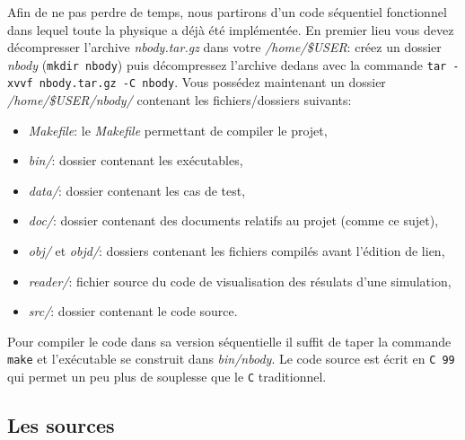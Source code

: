 Afin de ne pas perdre de temps, nous partirons d'un code séquentiel fonctionnel dans lequel toute la physique a déjà été implémentée.
En premier lieu vous devez décompresser l'archive \textit{nbody.tar.gz} dans votre \textit{/home/\$USER}:
créez un dossier \textit{nbody} (\texttt{mkdir nbody}) puis décompressez l'archive dedans avec la commande \texttt{tar -xvvf nbody.tar.gz -C nbody}.
Vous possédez maintenant un dossier \textit{/home/\$USER/nbody/} contenant les fichiers/dossiers suivants:
\begin{itemize}
	\item \textit{Makefile}: le \textit{Makefile} permettant de compiler le projet,
	\item \textit{bin/}: dossier contenant les exécutables,
	\item \textit{data/}: dossier contenant les cas de test,
	\item \textit{doc/}: dossier contenant des documents relatifs au projet (comme ce sujet),
	\item \textit{obj/} et \textit{objd/}: dossiers contenant les fichiers compilés avant l'édition de lien,
	\item \textit{reader/}: fichier source du code de visualisation des résulats d'une simulation,
	\item \textit{src/}: dossier contenant le code source.
\end{itemize}
Pour compiler le code dans sa version séquentielle il suffit de taper la commande \texttt{make} et l'exécutable se construit dans \textit{bin/nbody}.
Le code source est écrit en \texttt{C 99} qui permet un peu plus de souplesse que le \texttt{C} traditionnel.

\subsection{Les sources}

